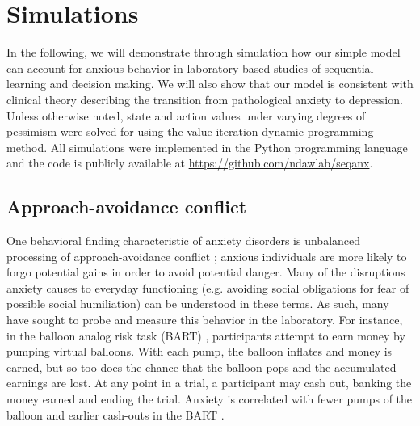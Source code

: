 \documentclass[11pt]{article} %
\begin{document}
\section{Simulations}

In the following, we will demonstrate through simulation how our simple model can account for anxious behavior in laboratory-based studies of sequential learning and decision making. We will also show that our model is consistent with clinical theory describing the transition from pathological anxiety to depression. Unless otherwise noted, state and action values under varying degrees of pessimism were solved for using the value iteration dynamic programming method\citep{SuttonBarto2018}. All simulations were implemented in the Python programming language and the code is publicly available at \url{https://github.com/ndawlab/seqanx}. 

\subsection{Approach-avoidance conflict}


One behavioral finding characteristic of anxiety disorders is unbalanced processing of approach-avoidance conflict \citep{aupperle2010}; anxious individuals are more likely to forgo potential gains in order to avoid potential danger. Many of the disruptions anxiety causes to everyday functioning (e.g. avoiding social obligations for fear of possible social humiliation) can be understood in these terms. As such, many have sought to probe and measure this behavior in the laboratory. For instance, in the balloon analog risk task (BART) \citep{Lejuez2002}, participants attempt to earn money by pumping virtual balloons. With each pump, the balloon inflates and money is earned, but so too does the chance that the balloon pops and the accumulated earnings are lost. At any point in a trial, a participant may cash out, banking the money earned and ending the trial. Anxiety is correlated with fewer pumps of the balloon and earlier cash-outs in the BART \citep{Maner2007, ramirez2015}.
\end{document}
